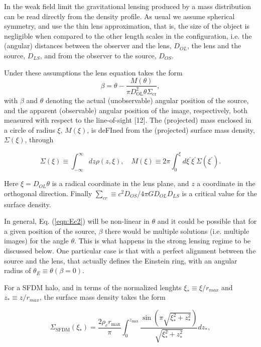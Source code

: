 \documentclass[9.5pt, twocolumn]{article}
\begin{document}
In the weak field limit the gravitational lensing produced by a mass distribution can be read directly from the density profile. As usual we assume spherical symmetry, and use the thin lens approximation, that is, the size of the object is negligible when compared to the other length scales in the configuration, i.e. the (angular) distances between the observer and the lens, $D_{OL}$, the lens and the source, $D_{LS}$, and from the observer to the source, $D_{OS}$.

Under these assumptions the lens equation takes the form
\begin{equation}
\beta=\theta-\frac{M(\theta)}{\pi D_{\mathrm{OL}}^{2} \theta \Sigma_{\mathrm{cr}}},
\label{eqn:Ec2}
\end{equation}
with $\beta$ and $\theta$ denoting the actual (unobservable) angular
position of the source, and the apparent (observable) angular
position of the image, respectively, both measured
with respect to the line-of-sight [12]. The (projected)
mass enclosed in a circle of radius $\xi$, $M(\xi)$, is deFIned from the (projected) surface mass density, $\Sigma(\xi)$, through

\begin{equation}
\Sigma(\xi) \equiv \int_{-\infty}^{\infty} d z \rho(z, \xi), \quad M(\xi) \equiv 2 \pi \int_{0}^{\xi} d \xi^{\prime} \xi^{\prime} \Sigma\left(\xi^{\prime}\right).
\label{eqn:Ec3}
\end{equation}

Here $\xi=D_{OL}\theta$ is a radical coordinate in the lens plane, and $z$ a coordinate in the orthogonal direction. Finally $\sum_{cr}\equiv c^2 D_{OS}/4\pi GD_{OL}D_{LS}$ is a critical value for the surface density. 

In general, Eq. (\ref{eqn:Ec2}) will be non-linear in $\theta$ and it could
be possible that for a given position of the source, $\beta$ there
would be multiple solutions (i.e. multiple images) for
the angle $\theta$. This is what happens in the strong lensing
regime to be discussed below. One particular case is that
with a perfect alignment between the source and the lens,
that actually defines the Einstein ring, with an angular
radius of $\theta_E\equiv\theta(\beta=0)$.

For a SFDM halo, and in terms of the normalized lenghts $\xi_{*}\equiv \xi/r_{max}$ and $z_*\equiv z/r_{max}$, the surface mass density takes the form

\begin{equation}
\Sigma_{\mathrm{SFDM}}\left(\xi_{*}\right)=\frac{2 \rho_{c} r_{\mathrm{max}}}{\pi} \int_{0}^{z_{\max }} \frac{\sin \left(\pi \sqrt{\xi_{*}^{2}+z_{*}^{2}}\right)}{\sqrt{\xi_{*}^{2}+z_{*}^{2}}} d z_{*},
\label{eqn:Ec4}
\end{equation}
\end{document}
